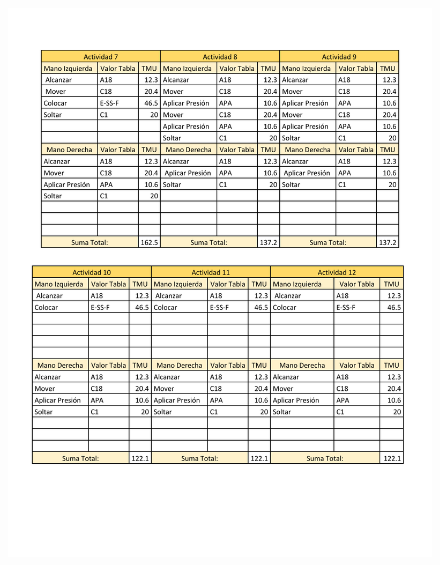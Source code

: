             \begin{figure}[H]
        \centering
        \includegraphics[trim = {5mm 45mm 1mm 10mm},clip,scale=0.35]{19/Img/tablaTMU2.pdf}
        \newpage
        \label{fig:tablaTMU2}    
    \end{figure}
